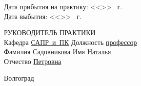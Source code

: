 \documentclass[a4paper, 14pt]{extreport}
\begin{document}
\begin{titlepage}
\begin{flushleft}
            Дата прибытия на практику: <<\underline{\hspace{1cm}}>> \underline{\hspace{3cm}} 
            \the\year\ г.\\
            Дата выбытия: \hspace{3cm}<<\underline{\hspace{1cm}}>> \underline{\hspace{3cm}} 
            \the\year\ г.
        \end{flushleft}
        \vspace{2cm}
        \begin{flushleft}
            РУКОВОДИТЕЛЬ ПРАКТИКИ\\
            Кафедра \underline{САПР~и~ПК\hspace{2.4cm}} Должность \underline{профессор\hspace{2.8em}} \\
            Фамилия \underline{Садовникова\hspace{2.1cm}} Имя \underline{Наталья\hspace{3.45cm}}\\
            Отчество \underline{Петровна\hspace{2.8cm}}
        \end{flushleft}
        \vspace{\fill}
        \begin{center}
            Волгоград \the\year
        \end{center}
    \end{titlepage}
\end{document}
